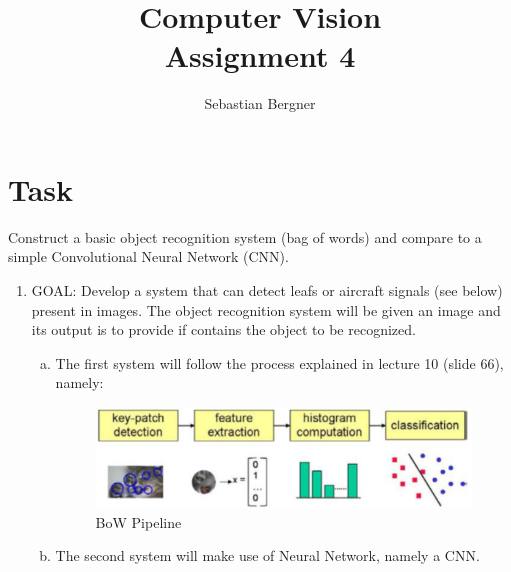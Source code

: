 \documentclass[UTF-8]{article}
\title{Computer Vision \\
	\large Assignment 4} %
\author{Sebastian Bergner}
\begin{document}
	
	\maketitle
	\section{Task}
	Construct  a  basic  object  recognition  system  (bag  of  words)  and  compare  to  a 
	simple Convolutional Neural Network (CNN).
	
	
	\begin{enumerate}[1.]
		\item GOAL: Develop a system that can detect leafs or aircraft signals (see below) present 
		in images. The object recognition system will be given an image and its output is to 
		provide if contains the object to be recognized.
		\begin{enumerate}[a.]
			\item The  first  system  will  follow  the  process  explained  in  lecture  10  (slide  66), 
			namely:
			\begin{figure}[H]
				\centering
				\includegraphics[width=0.7\linewidth]{_images/stepsSVM}
				\caption{BoW Pipeline}
				\label{fig:stepssvm}
			\end{figure}
			\item The second system will make use of Neural Network, namely a CNN.
		\end{enumerate}
	

\end{enumerate}
\end{document}
